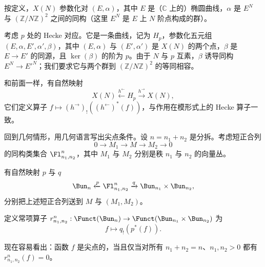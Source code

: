 按定义，$X(N)$ 参数化对 $(E,\alpha)$，其中 $E$ 是（$\mathbb{C}$ 上的）椭圆曲线，$\alpha$ 是 $E^N$ 与 $(\mathbb{Z}/N\mathbb{Z})^2$ 之间的同构（这里 $E^N$ 是 $E$ 上 $N$ 阶点构成的群）。

考虑 $p$ 处的 Hecke 对应。它是一条曲线，记为 $H_p$，参数化五元组 $(E,\alpha,E',\alpha',\beta)$，其中 $(E,\alpha)$ 与 $(E',\alpha')$ 是 $X(N)$ 的两个点，$\beta$ 是 $E\to E'$ 的同源，且 $\ker(\beta)$ 的阶为 $p$。由于 $N$ 与 $p$ 互素，$\beta$ 诱导同构 $E^N\to E'^N$；我们要求它与两个群到 $(\mathbb{Z}/N\mathbb{Z})^2$ 的等同相容。

和前面一样，有自然映射
\[
X(N)\xleftarrow{h^{\leftarrow}}H_p\xrightarrow{h^{\rightarrow}}X(N),
\]
它们定义算子 $f\mapsto(h^{\rightarrow})_!((h^{\leftarrow})^*(f))$，与作用在模形式上的 Hecke 算子一致。

回到几何情形，用几何语言写出尖点条件。设 $n=n_1+n_2$ 是分拆。考虑短正合列
\[
0\to M_1\to M\to M_2\to 0
\]
的同构类集合 $\Fl^n_{n_1,n_2}$，其中 $M_1$ 与 $M_2$ 分别是秩 $n_1$ 与 $n_2$ 的向量丛。

有自然映射 $p$ 与 $q$
\[
\Bun_n\xleftarrow{p}\Fl^n_{n_1,n_2}\xrightarrow{q}\Bun_{n_1}\times\Bun_{n_2},
\]
分别把上述短正合列送到 $M$ 与 $(M_1,M_2)$。

定义常项算子 $r^n_{n_1,n_2}:\Funct(\Bun_n)\to\Funct(\Bun_{n_1}\times\Bun_{n_2})$ 为
\[
f\mapsto q_!(p^*(f)).
\]

现在容易看出：函数 $f$ 是尖点的，当且仅当对所有 $n_1+n_2=n$、$n_1,n_2>0$ 都有 \mbox{$r^n_{n_1,n_2}(f)=0$}。
